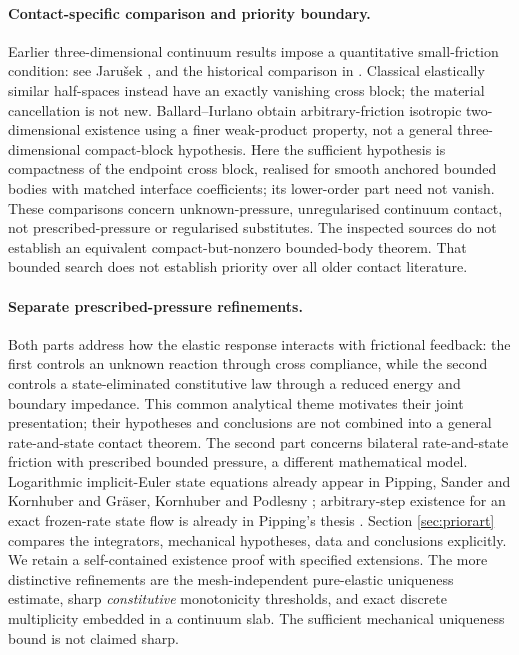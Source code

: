\documentclass[11pt,a4paper]{article}
\theoremstyle{definition}\newtheorem{definition}[theorem]{Definition}
\theoremstyle{remark}\newtheorem{remark}[theorem]{Remark}
\numberwithin{equation}{section}
\begin{document}
\paragraph{Contact-specific comparison and priority boundary.}
Earlier three-dimensional continuum results impose a quantitative small-friction condition: see Jaru\v{s}ek \cite[Theorems 2.2 and 3.1, and Section 4]{Jarusek}, and the historical comparison in \cite[Section 1.2]{BI}. Classical elastically similar half-spaces instead have an exactly vanishing cross block; the material cancellation is not new. Ballard--Iurlano \cite[Theorems 2.12 and 2.13]{BI} obtain arbitrary-friction isotropic two-dimensional existence using a finer weak-product property, not a general three-dimensional compact-block hypothesis. Here the sufficient hypothesis is compactness of the endpoint cross block, realised for smooth anchored bounded bodies with matched interface coefficients; its lower-order part need not vanish. These comparisons concern unknown-pressure, unregularised continuum contact, not prescribed-pressure or regularised substitutes. The inspected sources do not establish an equivalent compact-but-nonzero bounded-body theorem. That bounded search does not establish priority over all older contact literature.

\paragraph{Separate prescribed-pressure refinements.}
Both parts address how the elastic response interacts with frictional feedback: the first controls an unknown reaction through cross compliance, while the second controls a state-eliminated constitutive law through a reduced energy and boundary impedance. This common analytical theme motivates their joint presentation; their hypotheses and conclusions are not combined into a general rate-and-state contact theorem.
The second part concerns bilateral rate-and-state friction with prescribed bounded pressure, a different mathematical model. Logarithmic implicit-Euler state equations already appear in Pipping, Sander and Kornhuber \cite{PSK} and Gr\"aser, Kornhuber and Podlesny \cite{GKP}; arbitrary-step existence for an exact frozen-rate state flow is already in Pipping's thesis \cite{PippingThesis}. Section \ref{sec:priorart} compares the integrators, mechanical hypotheses, data and conclusions explicitly. We retain a self-contained existence proof with specified extensions. The more distinctive refinements are the mesh-independent pure-elastic uniqueness estimate, sharp \emph{constitutive} monotonicity thresholds, and exact discrete multiplicity embedded in a continuum slab. The sufficient mechanical uniqueness bound is not claimed sharp.
\end{document}

